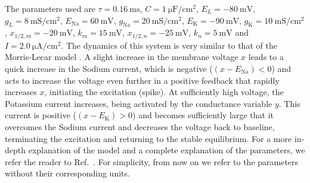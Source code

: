 The parameters used are $\tau = \SI{0.16}{\milli\second}$, $C = \SI{1}{\micro\farad/\centi\meter\squared}$, $E_L = -\SI{80}{\milli\volt}$,$g_L = \SI{8}{\milli\siemens/\centi\meter\squared}$, $E_\mathrm{Na} = \SI{60}{\milli\volt}$, $g_\mathrm{Na} = \SI{20}{\milli\siemens/\centi\meter\squared}$, $E_\mathrm{K} = -\SI{90}{\milli\volt}$, $g_\mathrm{K} = \SI{10}{\milli\siemens/\centi\meter\squared}$, $x_{1/2, m} = \SI{-20}{\milli\volt}$, $k_m = \SI{15}{\milli\volt}$, $x_{1/2, n} = \SI{-25}{\milli\volt}$,  $k_n = \SI{5}{\milli\volt}$ and $I = \SI{2.0}{\micro\ampere/\centi\meter\squared}$. The dynamics of this system is very similar to that of the Morris-Lecar model \cite{morris1981voltage, izhikevichbook}. A slight increase in the membrane voltage $x$ leads to a quick increase in the Sodium current, which is negative ($(x-E_\mathrm{Na}) < 0$) and acts to increase the voltage even further in a positive feedback that rapidly increases $x$, initiating the excitation (spike). At sufficiently high voltage, the Potassium current increases, being activated by the conductance variable $y$. This current is positive ($(x-E_\mathrm{K})>0$) and becomes sufficiently large that it overcomes the Sodium current and decreases the voltage back to baseline, terminating the excitation and returning to the stable equilibrium. For a more in-depth explanation of the model and a complete explanation of the parameters, we refer the reader to Ref.~\cite{izhikevichbook}. For simplicity, from now on we refer to the parameters without their corresponding units. %

